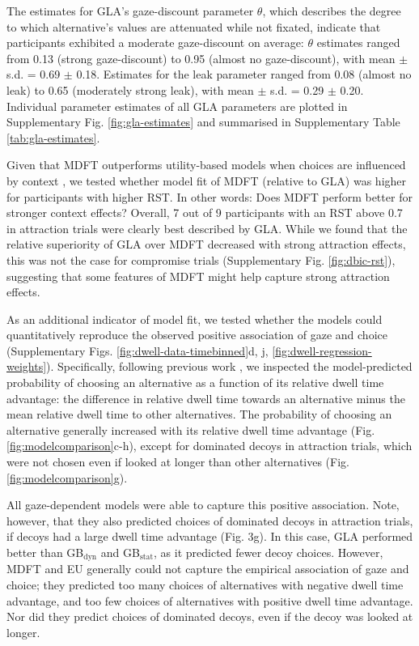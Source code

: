 \documentclass[11pt, a4paper]{article}
\begin{document}
The estimates for GLA’s gaze-discount parameter $\theta$, which describes the degree to which alternative’s values are attenuated while not fixated, indicate that participants exhibited a moderate gaze-discount on average: $\theta$ estimates ranged from 0.13 (strong gaze-discount) to 0.95 (almost no gaze-discount), with mean $\pm$ s.d. = 0.69 $\pm$ 0.18. Estimates for the leak parameter ranged from 0.08 (almost no leak) to 0.65 (moderately strong leak), with mean $\pm$ s.d. = 0.29 $\pm$ 0.20. Individual parameter estimates of all GLA parameters are plotted in Supplementary Fig. \ref{fig:gla-estimates} and summarised in Supplementary Table \ref{tab:gla-estimates}.

Given that MDFT outperforms utility-based models when choices are influenced by context \parencite{berkowitsch2014RigorouslyTestingMultialternative}, we tested whether model fit of MDFT (relative to GLA) was higher for participants with higher RST. In other words: Does MDFT perform better for stronger context effects? Overall, 7 out of 9 participants with an RST above 0.7 in attraction trials were clearly best described by GLA. While we found that the relative superiority of GLA over MDFT decreased with strong attraction effects, this was not the case for compromise trials (Supplementary Fig. \ref{fig:dbic-rst}), suggesting that some features of MDFT might help capture strong attraction effects.

As an additional indicator of model fit, we tested whether the models could quantitatively reproduce the observed positive association of gaze and choice (Supplementary Figs. \ref{fig:dwell-data-timebinned}d, j, \ref{fig:dwell-regression-weights}). Specifically, following previous work \parencite{krajbich2010VisualFixationsComputation,krajbich2011MultialternativeDriftdiffusionModel}, we inspected the model-predicted probability of choosing an alternative as a function of its relative dwell time advantage: the difference in relative dwell time towards an alternative minus the mean relative dwell time to other alternatives. The probability of choosing an alternative generally increased with its relative dwell time advantage (Fig. \ref{fig:modelcomparison}c-h), except for dominated decoys in attraction trials, which were not chosen even if looked at longer than other alternatives (Fig. \ref{fig:modelcomparison}g).

All gaze-dependent models were able to capture this positive association. Note, however, that they also predicted choices of dominated decoys in attraction trials, if decoys had a large dwell time advantage (Fig. 3g). In this case, GLA performed better than GB$_{\text{dyn}}$ and GB$_{\text{stat}}$, as it predicted fewer decoy choices. However, MDFT and EU generally could not capture the empirical association of gaze and choice; they predicted too many choices of alternatives with negative dwell time advantage, and too few choices of alternatives with positive dwell time advantage. 
Nor did they predict choices of dominated decoys, even if the decoy was looked at longer.
\end{document}
